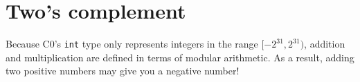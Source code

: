 \section*{Two's complement%
}

Because C0's \lstinline'int' type only represents integers in the range
$[-2^{31}, 2^{31})$, addition and multiplication are defined in terms
of modular arithmetic. As a result, adding two positive numbers may
give you a negative number!
